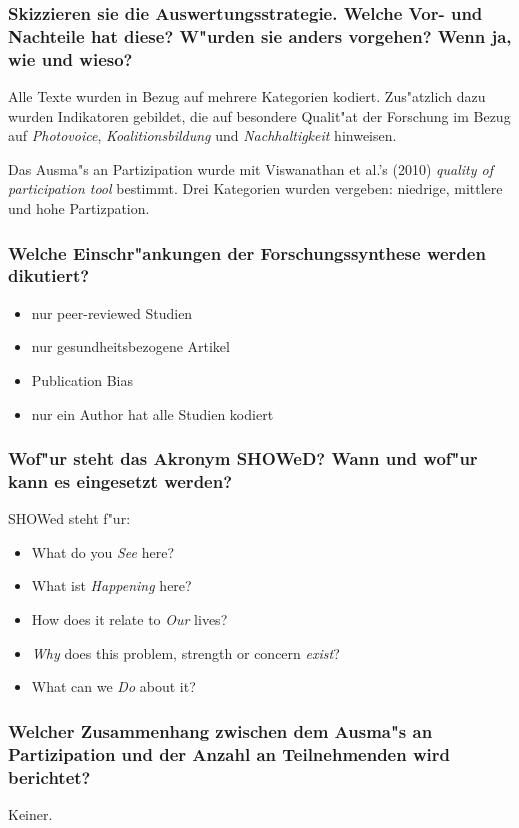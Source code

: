 \subsubsection{Skizzieren sie die Auswertungsstrategie. Welche Vor- und Nachteile hat diese? W"urden sie anders vorgehen? Wenn ja, wie und wieso?}
Alle Texte wurden in Bezug auf mehrere Kategorien kodiert. Zus"atzlich dazu wurden Indikatoren gebildet, die auf besondere Qualit"at der Forschung im Bezug auf \emph{Photovoice}, \emph{Koalitionsbildung} und \emph{Nachhaltigkeit} hinweisen.

Das Ausma"s an Partizipation wurde mit Viswanathan et al.'s (2010) \emph{quality of participation tool} bestimmt. Drei Kategorien wurden vergeben: niedrige, mittlere und hohe Partizpation.

\subsubsection{Welche Einschr"ankungen der Forschungssynthese werden dikutiert?}
\begin{itemize}
        \item nur peer-reviewed Studien 
        \item nur gesundheitsbezogene Artikel
        \item Publication Bias
        \item nur ein Author hat alle Studien kodiert
\end{itemize}

\subsubsection{Wof"ur steht das Akronym SHOWeD? Wann und wof"ur kann es eingesetzt werden?}
SHOWed steht f"ur:
\begin{itemize}
        \item What do you \emph{See} here?
        \item What ist \emph{Happening} here?
        \item How does it relate to \emph{Our} lives?
        \item \emph{Why} does this problem, strength or concern \emph{exist}?
        \item What can we \emph{Do} about it?
\end{itemize}

\subsubsection{Welcher Zusammenhang zwischen dem Ausma"s an Partizipation und der Anzahl an Teilnehmenden wird berichtet?}
Keiner.

